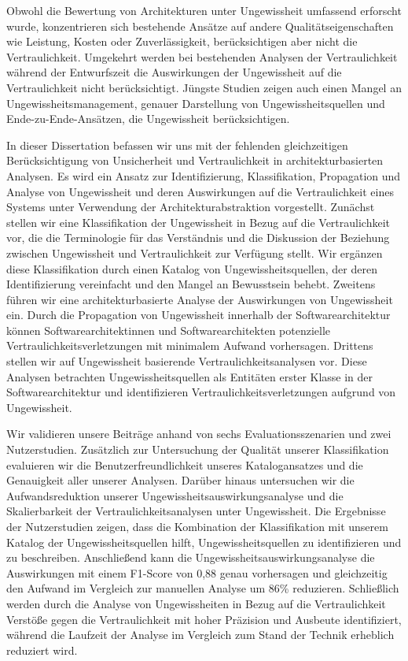 {Obwohl die Bewertung von Architekturen unter Ungewissheit umfassend erforscht wurde, konzentrieren sich bestehende Ansätze auf andere Qualitätseigenschaften wie Leistung, Kosten oder Zuverlässigkeit, berücksichtigen aber nicht die Vertraulichkeit.
Umgekehrt werden bei bestehenden Analysen der Vertraulichkeit während der Entwurfszeit die Auswirkungen der Ungewissheit auf die Vertraulichkeit nicht berücksichtigt.
Jüngste Studien zeigen auch einen Mangel an Ungewissheitsmanagement, genauer Darstellung von Ungewissheitsquellen und Ende-zu-Ende-Ansätzen, die Ungewissheit berücksichtigen.

In dieser Dissertation befassen wir uns mit der fehlenden gleichzeitigen Berücksichtigung von Unsicherheit und Vertraulichkeit in architekturbasierten Analysen.
Es wird ein Ansatz zur Identifizierung, Klassifikation, Propagation und Analyse von Ungewissheit und deren Auswirkungen auf die Vertraulichkeit eines Systems unter Verwendung der Architekturabstraktion vorgestellt.
Zunächst stellen wir eine Klassifikation der Ungewissheit in Bezug auf die Vertraulichkeit vor, die die Terminologie für das Verständnis und die Diskussion der Beziehung zwischen Ungewissheit und Vertraulichkeit zur Verfügung stellt.
Wir ergänzen diese Klassifikation durch einen Katalog von Ungewissheitsquellen, der deren Identifizierung vereinfacht und den Mangel an Bewusstsein behebt.
Zweitens führen wir eine architekturbasierte Analyse der Auswirkungen von Ungewissheit ein.
Durch die Propagation von Ungewissheit innerhalb der Softwarearchitektur können Softwarearchitektinnen und Softwarearchitekten potenzielle Vertraulichkeitsverletzungen mit minimalem Aufwand vorhersagen.
Drittens stellen wir auf Ungewissheit basierende Vertraulichkeitsanalysen vor.
Diese Analysen betrachten Ungewissheitsquellen als Entitäten erster Klasse in der Softwarearchitektur und identifizieren Vertraulichkeitsverletzungen aufgrund von Ungewissheit.

Wir validieren unsere Beiträge anhand von sechs Evaluationsszenarien und zwei Nutzerstudien.
Zusätzlich zur Untersuchung der Qualität unserer Klassifikation evaluieren wir die Benutzerfreundlichkeit unseres Katalogansatzes und die Genauigkeit aller unserer Analysen.
Darüber hinaus untersuchen wir die Aufwandsreduktion unserer Ungewissheitsauswirkungsanalyse und die Skalierbarkeit der Vertraulichkeitsanalysen unter Ungewissheit.
Die Ergebnisse der Nutzerstudien zeigen, dass die Kombination der Klassifikation mit unserem Katalog der Ungewissheitsquellen hilft, Ungewissheitsquellen zu identifizieren und zu beschreiben.
Anschließend kann die Ungewissheitsauswirkungsanalyse die Auswirkungen mit einem F1-Score von 0,88 genau vorhersagen und gleichzeitig den Aufwand im Vergleich zur manuellen Analyse um 86\% reduzieren.
Schließlich werden durch die Analyse von Ungewissheiten in Bezug auf die Vertraulichkeit Verstöße gegen die Vertraulichkeit mit hoher Präzision und Ausbeute identifiziert, während die Laufzeit der Analyse im Vergleich zum Stand der Technik erheblich reduziert wird.

}
